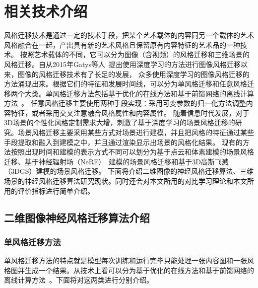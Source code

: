 \chapter{相关技术介绍}
风格迁移技术是通过一定的技术手段，把某个艺术载体的内容同另一个载体的艺术风格融合在一起，产出具有新的艺术风格且保留原有内容特征的艺术品的一种技术。
按照艺术载体的不同，它可以分为图像（含视频）的风格迁移和三维场景的风格迁移。自从2015年Gatys等人~\cite{gatys2016image}提出使用深度学习的方法进行图像风格迁移以来，图像的风格迁移技术有了长足的发展，
众多使用深度学习的图像风格迁移的方法涌现出来。根据它们的特征和发展时间线，可以分为单风格迁移和任意风格迁移两个大类。单风格迁移方法包括基于优化的在线方法和基于前馈网络的离线计算方法~\cite{jing2019neural}。
任意风格迁移主要使用两种手段实现：采用可变参数的归一化方法调整内容特征，或者采用交叉注意融合风格属性和内容属性。
随着信息时代发展，对于3D场景的个性化风格定制需求大增，刺激了基于深度学习的场景风格迁移的研究。场景风格迁移主要采用某些方式对场景进行建模，并且把风格的特征通过某些手段提取和融入到建模之中，并且通过渲染显示出场景的风格化结果。
现有的方法按照出现时间和建模的表示方式不同可以划分为基于点云和体素建模的场景风格迁移、基于神经辐射场（NeRF）~\cite{mildenhall2021nerf}建模的场景风格迁移和基于3D高斯飞溅（3DGS）建模的场景风格迁移。
下面将介绍二维图像的神经风格迁移算法、三维场景的神经风格迁移算法研究现状。同时还会对本文所用的对比学习理论和本文所用的评价指标进行简单介绍。
\section{二维图像神经风格迁移算法介绍}
\subsection{单风格迁移方法}
单风格迁移方法的特点就是模型每次训练和运行完毕只能处理一张内容图和一张风格图并生成一个结果。从技术上看可以分为基于优化的在线方法和基于前馈网络的离线计算方法~\cite{jing2019neural}。下面将对这两类进行分别介绍。

